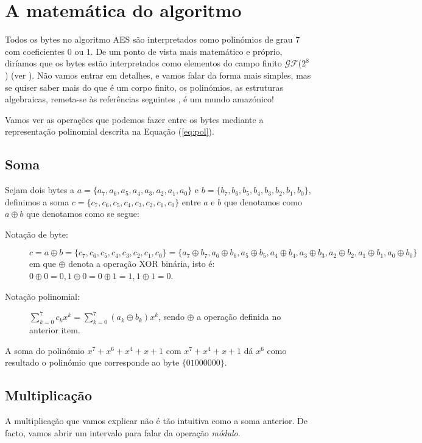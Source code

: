 \section{A matemática do algoritmo}
Todos os bytes no algoritmo AES são interpretados como polinómios de grau 7 com coeficientes  $0$ ou $1$. De um ponto de vista mais matemático e próprio, diríamos que os bytes estão interpretados como elementos do campo finito $\mathcal{GF}$($2^8$) (ver \cite{Hart}). Não vamos entrar em detalhes, e vamos falar da forma mais simples, mas se quiser saber mais do que é um corpo finito, os polinómios, as estruturas algebraicas, remeta-se às referências seguintes \cite{Hart,Hilton,HUnger}, é um mundo amazónico!

Vamos ver as operações que podemos fazer entre os bytes mediante a representação polinomial descrita na Equação (\ref{eq:pol}).
\subsection{Soma}\label{ss:suma}
Sejam dois bytes a $a=\{a_7,a_6,a_5,a_4,a_3,a_2,a_1,a_0\}$ e $b=\{b_7,b_6,b_5,b_4,b_3,b_2,b_1,b_0\}$, definimos a soma  $c=\{c_7,c_6,c_5,c_4,c_3,c_2,c_1,c_0\}$ entre $a$ e $b$ que denotamos como $a \oplus b$ que denotamos  como se segue:
\begin{description}
\item[Notação de byte:]
$c=a\oplus b=\{c_7,c_6,c_5,c_4,c_3,c_2,c_1,c_0\}=\{a_7 \oplus b_7,a_6 \oplus b_6,a_5 \oplus b_5,a_4 \oplus b_4,a_3 \oplus b_3,a_2 \oplus b_2,a_1\oplus b_1 ,a_0 \oplus b_0\}$ em que $\oplus$ denota a operação XOR binária, isto é: $0 \oplus 0=0, 1 \oplus 0=0 \oplus 1=1, 1 \oplus 1=0 $.
\item[Notação polinomial:] $\sum_{k=0}^7 c_k x^k=\sum_{k=0}^7 (a_k \oplus b_k) x^k$, sendo $\oplus$ a operação definida no anterior item.
\end{description}
\begin{example}
A soma do polinómio $x^7+x^6+x^4+x+1$ com $x^7+x^4+x+1$ dá $x^6$ como resultado o polinómio que corresponde ao byte $\{01000000\}$.
\end{example}

\subsection{Multiplicação}\label{ss:prod}
A multiplicação que vamos explicar não é tão intuitiva como a soma anterior. De facto, vamos abrir um intervalo para falar da operação {\sl módulo}.


